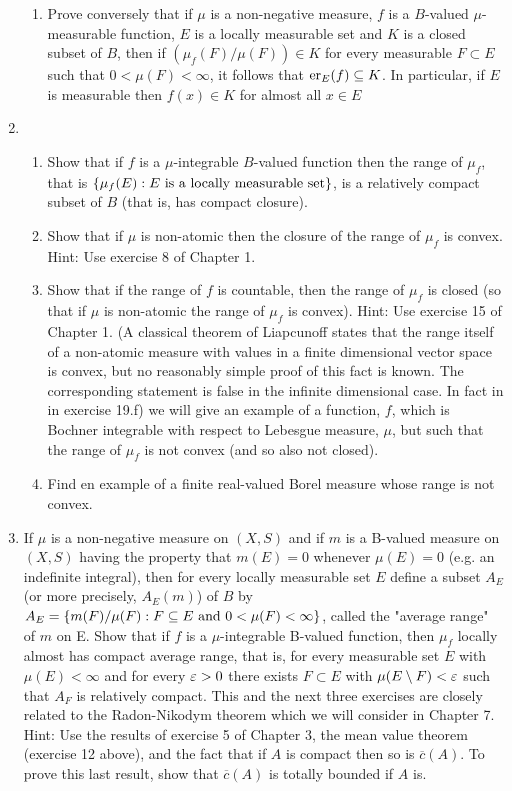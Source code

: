 \begin{enumerate}[label=\arabic*)]
\begin{enumerate}[label=\alph*)]
    \item Prove conversely that if $\mu$ is a non-negative measure, $f$ is a $B$-valued $\mu$-measurable function, $E$ is a locally measurable set and $K$ is a closed subset of $B$, then if $(\mu_f(F)/\mu(F))\in K$ for every measurable $F \subset E$ such that $0<\mu(F)<\infty$, it follows that $\er{f}{E}\subseteq K$. In particular, if $E$ is measurable then $f(x)\in K$ for almost all $x \in E$
\end{enumerate}

\item
\begin{enumerate}[label=\alph*)]
    \item Show that if $f$ is a $\mu$-integrable $B$-valued function then the range of $\mu_f$, that is $\brc{\mu_f(E): E\text{ is a locally measurable set}}$, is a relatively compact subset of $B$ (that is, has compact closure).
    
    \item Show that if $\mu$ is non-atomic then the closure of the range of $\mu_f$ is convex. Hint: Use exercise 8 of Chapter 1.

    \item Show that if the range of $f$ is countable, then the range of $\mu_f$ is closed (so that if $\mu$ is non-atomic the range of $\mu_f$ is convex). Hint: Use exercise 15 of Chapter 1. (A classical theorem of Liapcunoff states that the range itself of a non-atomic measure with values in a finite dimensional vector space is convex, but no reasonably simple proof of this fact is known. The corresponding statement is false in the infinite dimensional case. In fact in in exercise 19.f) we will give an example of a function, $f$, which is Bochner integrable with respect to Lebesgue measure, $\mu$, but such that the range of $\mu_f$ is not convex (and so also not closed).
    
    \item Find en example of a finite real-valued Borel measure whose range is not convex.
\end{enumerate}

\item If $\mu$ is a non-negative measure on $(X, S)$ and if $m$ is a B-valued measure on $(X,S)$ having the property that $m(E)=0$ whenever $\mu(E)=0$ (e.g. an indefinite integral), then for every locally measurable set $E$ define a subset $A_E$ (or more precisely, $A_E(m)$) of $B$ by $A_E=\brc{m(F)/\mu(F):F\subseteq E\text{ and }0<\mu(F)<\infty}$, called the "average range" of $m$ on E. Show that if $f$ is a $\mu$-integrable B-valued function, then $\mu_f$ locally almost has compact average range, that is, for every measurable set $E$ with $\mu(E)<\infty$ and for every $\ep>0$ there exists $F\subset E$ with $\mu(E\sd F)<\ep$ such that $A_F$ is relatively compact. This and the next three exercises are closely related to the Radon-Nikodym theorem which we will consider in Chapter 7. Hint: Use the results of exercise 5 of Chapter 3, the mean value theorem (exercise 12 above), and the fact that if $A$ is compact then so is $\overline{c}(A)$. To prove this last result, show that $\overline{c}(A)$ is totally bounded if $A$ is.


\end{enumerate}
